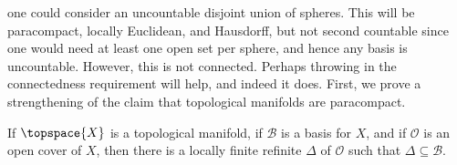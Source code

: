 \documentclass{article}                                                        %
\begin{document}
            one could consider an uncountable disjoint union of spheres. This
            will be paracompact, locally Euclidean, and Hausdorff, but not
            second countable since one would need at least one open set per
            sphere, and hence any basis is uncountable. However, this is not
            connected. Perhaps throwing in the connectedness requirement will
            help, and indeed it does. First, we prove a strengthening of the
            claim that topological manifolds are paracompact.
            \begin{theorem}
                If $\topspace{X}$ is a topological manifold, if $\mathcal{B}$ is
                a basis for $X$, and if $\mathcal{O}$ is an open cover of $X$,
                then there is a locally finite refinite $\Delta$ of
                $\mathcal{O}$ such that $\Delta\subseteq\mathcal{B}$.
            \end{theorem}
\end{document}
